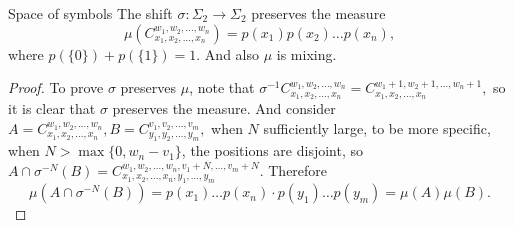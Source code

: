 \documentclass[12pt,a4paper]{article}
\begin{document}
	
	
	\begin{proposition}{Space of symbols}{}
		The shift $\sigma:\Sigma_2\rightarrow \Sigma_2$ preserves the measure 
		$$
		\mu(C_{x_1,x_2,\dots,x_n}^{w_1,w_2,\dots,w_n})=p(x_1)p(x_2)\dots p(x_n),
		$$
		where $p(\{0\})+p(\{1\})=1$. And also $\mu$ is mixing.
	\end{proposition}
	\begin{proof}
		To prove $\sigma$ preserves $\mu$, note that
		$
		\sigma^{-1}C_{x_1,x_2,\dots,x_n}^{w_1,w_2,\dots,w_n}=C_{x_1,x_2,\dots,x_n}^{w_1+1,w_2+1,\dots,w_n+1},
		$
		so it is clear that $\sigma$ preserves the measure. And consider
		$
		A=C_{x_1,x_2,\dots,x_n}^{w_1,w_2,\dots,w_n}, B=C_{y_1,y_2,\dots,y_m}^{v_1,v_2,\dots,v_m},
		$
		when $N$ sufficiently large, to be more specific, when $N>\max\{0,w_n-v_1\}$, the positions are disjoint, so $A\cap \sigma^{-N}(B)=C_{x_1,x_2,\dots,x_n,y_1,\dots,y_m}^{w_1,w_2,\dots,w_n,v_1+N,\dots,v_m+N}$. Therefore
		$$
		\mu(A\cap \sigma^{-N}(B))=p(x_1)\dots p(x_n)\cdot p(y_1)\dots p(y_m)=\mu(A)\mu(B).
		$$
	\end{proof}
	
\end{document}

